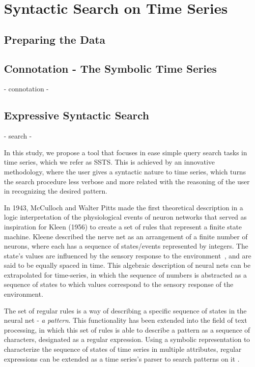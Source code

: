 \section{Syntactic Search on Time Series}

\subsection{Preparing the Data}

\subsection{Connotation - The Symbolic Time Series}

- connotation -

\subsection{Expressive Syntactic Search}

- search -

In this study, we propose a tool that focuses in ease simple query search tasks in time series, which we refer as \gls{SSTS}. This is achieved by an innovative methodology, where the user gives a syntactic nature to time series, which turns the search procedure less verbose and more related with the reasoning of the user in recognizing the desired pattern.



In 1943, McCulloch and Walter Pitts made the first theoretical description in a logic interpretation of the physiological events of neuron networks that served as inspiration for Kleen (1956) to create a set of rules that represent a finite state machine. Kleene described the nerve net as an arrangement of a finite number of neurons, where each has a sequence of states/events represented by integers. The state's values are influenced by the sensory response to the environment~\citep{Kleene}, and are said to be equally spaced in time. This algebraic description of neural nets can be extrapolated for time-series, in which the sequence of numbers is abstracted as a sequence of states to which values correspond to the sensory response of the environment. 
\par
The set of regular rules is a way of describing a specific sequence of states in the neural net - \textit{a pattern}. This functionality has been extended into the field of text processing, in which this set of rules is able to describe a pattern as a sequence of characters, designated as a regular expression. Using a symbolic representation to characterize the sequence of states of time series in multiple attributes, regular expressions can be extended as a time series's parser to search patterns on it \citep{Thompson}. 


